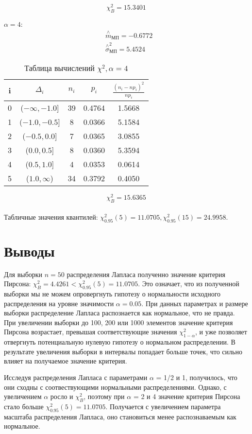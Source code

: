 \documentclass[a4]{article}
\begin{document}
$$\chi_B^2 =15.3401$$ 

$\alpha= 4$:
  \begin{equation}
  \begin{split}
  &\overset{\wedge}{m}_{\text{МП}} = -0.6772\\
  &  \overset{\wedge}{\sigma}^2_{\text{МП}} = 5.4524
  \end{split}
  \end{equation}

\begin{table}[H]
	\caption{Таблица вычислений $\chi^2, \alpha= 4$}
	\label{tab:my_label1}
	\begin{center}
		\vspace{5mm}
		\begin{tabular}{|c|c|c|c|c|}
			\hline
			i & $\Delta_i$ & $n_i$ & $p_i$ & $\frac{(n_i-np_i)^2}{np_i}$\\ \hline
0&  ($-\infty ,-1.0$]&  39&  0.4764&  1.5668\\ \hline
1&  ($-1.0,-0.5$]&  8&  0.0366&  5.1584\\ \hline
2&  ($-0.5,0.0$]&  7&  0.0365&  3.0855\\ \hline
3&  ($0.0,0.5$]&  8&  0.0360&  5.3594\\ \hline
4&  ($0.5,1.0$]&  4&  0.0353&  0.0614\\ \hline
5&  ($ 1.0,\infty$)&  34&  0.3792&  0.4050\\ \hline
		\end{tabular}
	\end{center}
\end{table}

$$\chi_B^2 =15.6365$$ \\
Табличные значения квантилей: $\chi^2_{0.95}(5) = 11.0705,  \chi^2_{0.95}(15) = 24.9958$.
\section{Выводы}
Для выборки $n = 50$ распределения Лапласа полученно значение критерия Пирсона: $\chi_B^2 = 4.4261 < \chi^2_{0.95}(5) = 11.0705$. Это означает, что из полученной выборки мы не можем опровергнуть гипотезу о нормальности исходного распределения на уровне значимости $\alpha = 0.05$. При данных параметрах и размере выборки распределение Лапласа распознается как нормальное, что не правда. При увеличении выборки до 100, 200 или 1000 элементов значение критерия Пирсона возрастает, превышая соответствующие значения $\chi^2_{1-\alpha}$, и уже позволяет отвергнуть потенциальную нулевую гипотезу о нормальном распределении. В результате увеличения выборки в интервалы попадает больше точек, что сильно влияет на получаемое значение критерия.\\
\par Исследуя распределения Лапласа с параметрами $\alpha$ = 1/2 и 1, получилось, что они сходны с соотвествующими нормальными распределениями. Однако, с увеличением $\alpha$ росло и $\chi_B^2$, поэтому при $\alpha$ = 2 и 4 значение критерия Пирсона стало больше $\chi^2_{0.95}(5) = 11.0705$. Получается с увеличением параметра масштаба распределения Лапласа, оно становиться менее распознаваемым как нормальное.
\end{document}
